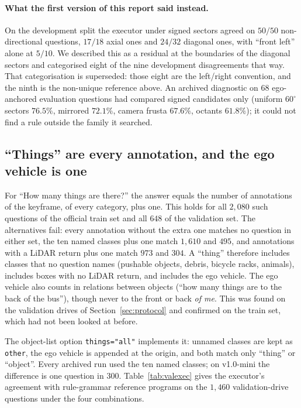 \documentclass[11pt,a4paper]{article}
\newcommand{\code}[1]{\texttt{\small #1}}
\begin{document}
\paragraph{What the first version of this report said instead.} On the
development split the executor under signed sectors agreed on $50/50$
non-directional questions, $17/18$ axial ones and $24/32$ diagonal ones, with
``front left'' alone at $5/10$. We described this as a residual at the
boundaries of the diagonal sectors and categorised eight of the nine
development disagreements that way. That categorisation is superseded: those
eight are the left/right convention, and the ninth is the non-unique
reference above. An archived diagnostic on $68$ ego-anchored evaluation
questions had compared signed candidates only (uniform $60^{\circ}$ sectors
$76.5\%$, mirrored $72.1\%$, camera frusta $67.6\%$, octants $61.8\%$); it
could not find a rule outside the family it searched.

\subsection{``Things'' are every annotation, and the ego vehicle is one}
\label{sec:things}

For ``How many things are there?'' the answer equals the number of
annotations of the keyframe, of every category, plus one. This holds for all
$2{,}080$ such questions of the official train set and all $648$ of the
validation set. The alternatives fail: every annotation without the extra one
matches no question in either set, the ten named classes plus one match
$1{,}610$ and $495$, and annotations with a LiDAR return plus one match $973$
and $304$. A ``thing'' therefore includes classes that no question names
(pushable objects, debris, bicycle racks, animals), includes boxes with no
LiDAR return, and includes the ego vehicle. The ego vehicle also counts in
relations between objects (``how many things are to the back of the bus''),
though never to the front or back \emph{of me}. This was found on the
validation drives of Section~\ref{sec:protocol} and confirmed on the train
set, which had not been looked at before.

The object-list option \code{things="all"} implements it: unnamed classes are
kept as \code{other}, the ego vehicle is appended at the origin, and both
match only ``thing'' or ``object''. Every archived run used the ten named
classes; on v1.0-mini the difference is one question in $300$.
Table~\ref{tab:valexec} gives the executor's agreement with rule-grammar
reference programs on the $1{,}460$ validation-drive questions under the four
combinations.
\end{document}
